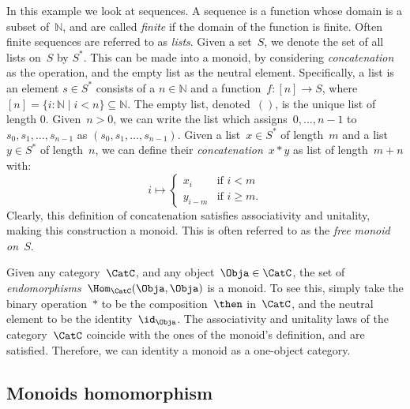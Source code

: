 \begin{example}
In this example we look at sequences. A sequence is a function whose domain is a subset of~$\mathbb{N}$, and are called \emph{finite} if the domain of the function is finite. Often finite sequences are referred to as \emph{lists}. Given a set~$S$, we denote the set of all lists on~$S$ by $S^\ast$. This can be made into a monoid, by considering \emph{concatenation} as the operation, and the empty list as the neutral element. Specifically, a list is an element $s\in S^\ast$ consists of a $n\in \mathbb{N}$ and a function~$f\colon [n]\to S$, where~$[n]=\{i\colon \mathbb{N}\mid i<n\}\subseteq \mathbb{N}$. The empty list, denoted~$()$, is the unique list of length 0. Given~$n>0$, we can write the list which assigns~$0,\ldots,n-1$ to~$s_0,s_1,\ldots,s_{n-1}$ as $(s_0,s_1,\ldots,s_{n-1})$. Given a list~$x\in S^\ast$ of length~$m$ and a list~$y\in S^\ast$ of length~$n$, we can define their \emph{concatenation}~$x*y$ as list of length~$m+n$ with:
\begin{equation*}
    i\mapsto
    \begin{cases}
    x_i&\text{if }i<m\\
    y_{i-m}&\text{if }i\geq m.
    \end{cases}
\end{equation*}
Clearly, this definition of concatenation satisfies associativity and unitality, making this construction a monoid. This is often referred to as the \emph{free monoid on~$S$}.
\end{example}

\begin{example}
Given any category~$\CatC$, and any object~$\Obja\in \CatC$, the set of \emph{endomorphisms}~$\Hom_{\CatC}(\Obja,\Obja)$ is a monoid. To see this, simply take the binary operation~$\ast$ to be the composition~$\then$ in~$\CatC$, and the neutral element to be the identity~$\id_\Obja$. The associativity and unitality laws of the category~$\CatC$ coincide with the ones of the monoid's definition, and are satisfied. Therefore, we can identity a monoid as a one-object category.
\end{example}

\subsection{Monoids homomorphism}




